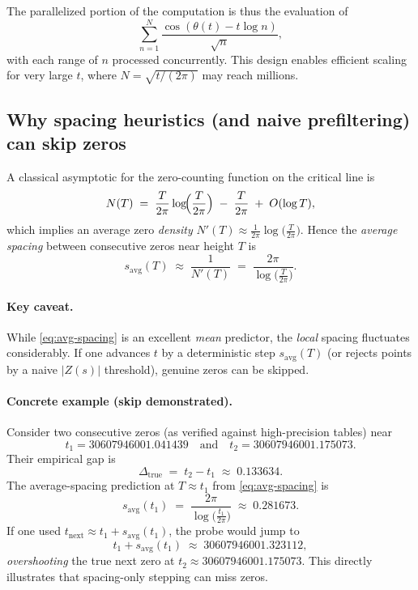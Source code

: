 \documentclass[11pt,a4paper]{article}
\begin{document}
The parallelized portion of the computation is thus the evaluation of
\[
    \sum_{n=1}^{N} \frac{\cos(\theta(t) - t \log n)}{\sqrt{n}},
\]
with each range of \( n \) processed concurrently.
This design enables efficient scaling for very large \( t \), where \( N = \sqrt{t / (2\pi)} \) may reach millions.

\subsection{Why spacing heuristics (and naive prefiltering) can skip zeros}\label{sec:spacing-skip}

A classical asymptotic for the zero-counting function on the critical line is
\begin{equation}
  N(T) \;=\; \frac{T}{2\pi}\log\!\Bigl(\frac{T}{2\pi}\Bigr) \;-\; \frac{T}{2\pi} \;+\; O(\log T),
  \label{eq:NT}
\end{equation}
which implies an average zero \emph{density}
\(
N'(T) \approx \frac{1}{2\pi}\log\!\bigl(\tfrac{T}{2\pi}\bigr).
\)
Hence the \emph{average spacing} between consecutive zeros near height \(T\) is
\begin{equation}
  s_{\mathrm{avg}}(T)
  \;\approx\;
  \frac{1}{N'(T)}
  \;=\;
  \frac{2\pi}{\log\!\bigl(\tfrac{T}{2\pi}\bigr)}.
  \label{eq:avg-spacing}
\end{equation}

\paragraph{Key caveat.}
While \eqref{eq:avg-spacing} is an excellent \emph{mean} predictor, the \emph{local} spacing fluctuates considerably. If one advances \(t\) by a deterministic step \(s_{\mathrm{avg}}(T)\) (or rejects points by a naive \(|Z(s)|\) threshold), genuine zeros can be skipped.

\paragraph{Concrete example (skip demonstrated).}
Consider two consecutive zeros (as verified against high-precision tables) near
\[
  t_1 = 30607946001.041439\quad\text{and}\quad
  t_2 = 30607946001.175073.
\]
Their empirical gap is
\[
  \Delta_{\mathrm{true}} \;=\; t_2 - t_1 \;\approx\; 0.133634.
\]
The average-spacing prediction at \(T \approx t_1\) from \eqref{eq:avg-spacing} is
\[
  s_{\mathrm{avg}}(t_1)
  \;=\;
  \frac{2\pi}{\log\!\bigl(\tfrac{t_1}{2\pi}\bigr)}
  \;\approx\; 0.281673.
\]
If one used \(t_{\mathrm{next}} \approx t_1 + s_{\mathrm{avg}}(t_1)\), the probe would jump to
\[
  t_1 + s_{\mathrm{avg}}(t_1)
  \;\approx\;
  30607946001.323112,
\]
\emph{overshooting} the true next zero at \(t_2 \approx 30607946001.175073\). This directly illustrates that spacing-only stepping can miss zeros.
\end{document}

